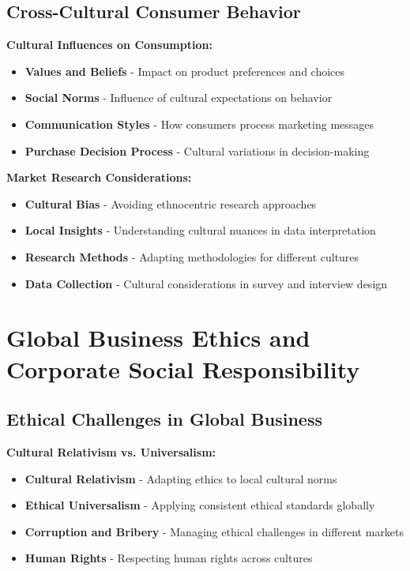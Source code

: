 \documentclass[12pt]{article}
\begin{document}
\subsection{Cross-Cultural Consumer Behavior}

\textbf{Cultural Influences on Consumption:}
\begin{itemize}
    \item \textbf{Values and Beliefs} - Impact on product preferences and choices
    \item \textbf{Social Norms} - Influence of cultural expectations on behavior
    \item \textbf{Communication Styles} - How consumers process marketing messages
    \item \textbf{Purchase Decision Process} - Cultural variations in decision-making
\end{itemize}

\textbf{Market Research Considerations:}
\begin{itemize}
    \item \textbf{Cultural Bias} - Avoiding ethnocentric research approaches
    \item \textbf{Local Insights} - Understanding cultural nuances in data interpretation
    \item \textbf{Research Methods} - Adapting methodologies for different cultures
    \item \textbf{Data Collection} - Cultural considerations in survey and interview design
\end{itemize}

\section{Global Business Ethics and Corporate Social Responsibility}

\subsection{Ethical Challenges in Global Business}

\textbf{Cultural Relativism vs. Universalism:}
\begin{itemize}
    \item \textbf{Cultural Relativism} - Adapting ethics to local cultural norms
    \item \textbf{Ethical Universalism} - Applying consistent ethical standards globally
    \item \textbf{Corruption and Bribery} - Managing ethical challenges in different markets
    \item \textbf{Human Rights} - Respecting human rights across cultures
\end{itemize}
\end{document}
